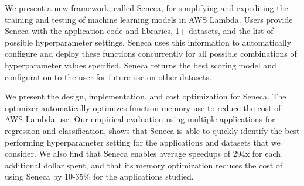 
We present a new framework, called Seneca, for simplifying and expediting
the training and testing of machine learning models in AWS Lambda.
Users provide Seneca with the application code and 
libraries, 1+ datasets, and the list 
of possible hyperparameter settings.  
Seneca uses this information to automatically
configure and deploy these functions concurrently for all possible 
combinations of hyperparameter values specified. Seneca
returns the best scoring model
and configuration to the user for future use on other datasets.

We present the design, implementation, and cost optimization for Seneca.
The optimizer automatically optimizes function memory use to reduce the cost
of AWS Lambda use.  Our empirical evaluation using
multiple applications for regression and classification,
shows that Seneca is able to quickly
identify the best performing hyperparameter setting 
for the applications and datasets that we consider.  
We also find that Seneca enables average speedups
of 294x for each additional dollar spent, and
that its memory optimization reduces the cost of using
Seneca by 10-35\% for the applications studied.


